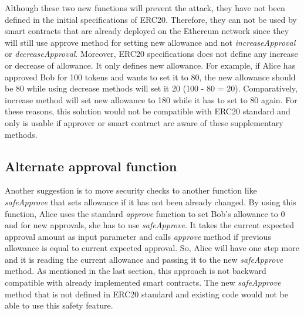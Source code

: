 \noindent Although these two new functions will prevent the attack, they have not been defined in the initial specifications of ERC20. Therefore, they can not be used by smart contracts that are already deployed on the Ethereum network since they will still use approve method for setting new allowance and not \textit{increaseApproval} or \textit{decreaseApproval}. Moreover, ERC20 specifications does not define any increase or decrease of allowance. It only defines new allowance. For example, if Alice has approved Bob for 100 tokens and wants to set it to 80, the new allowance should be 80 while using decrease methods will set it 20 (100 - 80 = 20). Comparatively, increase method will set new allowance to 180 while it has to set to 80 again. For these reasons, this solution would not be compatible with ERC20 standard and only is usable if approver or smart contract are aware of these supplementary methods.

\subsection{Alternate approval function}
Another suggestion\cite{Ref16} is to move security checks to another function like \textit{safeApprove} that sets allowance if it has not been already changed. By using this function, Alice uses the standard \textit{approve} function to set Bob’s allowance to 0 and for new approvals, she has to use \textit{safeApprove}. It takes the current expected approval amount as input parameter and calls \textit{approve} method if previous allowance is equal to current expected approval. So, Alice will have one step more and it is reading the current allowance and passing it to the new \textit{safeApprove} method. As mentioned in the last section, this approach is not backward compatible with already implemented smart contracts. The new \textit{safeApprove} method that is not defined in ERC20 standard and existing code would not be able to use this safety feature.

